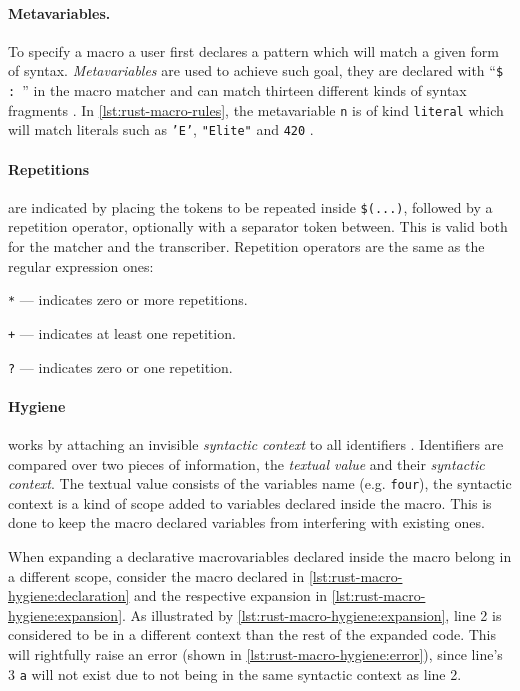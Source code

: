\paragraph{Metavariables.}
To specify a macro a user first declares a pattern which will match a given form of syntax.
\emph{Metavariables} are used to achieve such goal,
they are declared with “\texttt{\$  : }” in the macro matcher and
can match thirteen different kinds of syntax fragments \autocite[Section 3.1 - Metavariables]{RustRef2021}.
In \autoref{lst:rust-macro-rules}, the metavariable \texttt{n} is of kind \texttt{literal}
which will match literals such as \texttt{'E'}, \texttt{"Elite"} and \texttt{420} \autocite[Section 8.2.1]{RustRef2021}.

\paragraph{Repetitions} are indicated by placing the tokens to be repeated inside \texttt{\$(...)},
followed by a repetition operator, optionally with a separator token between.
This is valid both for the matcher and the transcriber.
Repetition operators are the same as the regular expression ones:
\begin{compactitem}
    \item \texttt{*} — indicates zero or more repetitions.
    \item \texttt{+} — indicates at least one repetition.
    \item \texttt{?} — indicates zero or one repetition.
\end{compactitem}

\paragraph{Hygiene} works by attaching an invisible \emph{syntactic context} to all identifiers \autocite{Wirth2021}.
Identifiers are compared over two pieces of information,
the \emph{textual value} and their \emph{syntactic context}.
The textual value consists of the variables name (e.g. \texttt{four}),
the syntactic context is a kind of scope added to variables declared inside the macro.
This is done to keep the macro declared variables from interfering with existing ones.

When expanding a declarative macro\footnotemark variables declared inside the macro belong in a different scope,
consider the macro declared in \autoref{lst:rust-macro-hygiene:declaration} and
the respective expansion in \autoref{lst:rust-macro-hygiene:expansion}.
As illustrated by \autoref{lst:rust-macro-hygiene:expansion},
line 2 is considered to be in a different context than the rest of the expanded code.
This will rightfully raise an error (shown in \autoref{lst:rust-macro-hygiene:error}),
since line's 3 \texttt{a} will not exist due to not being in the same syntactic context as line 2.

